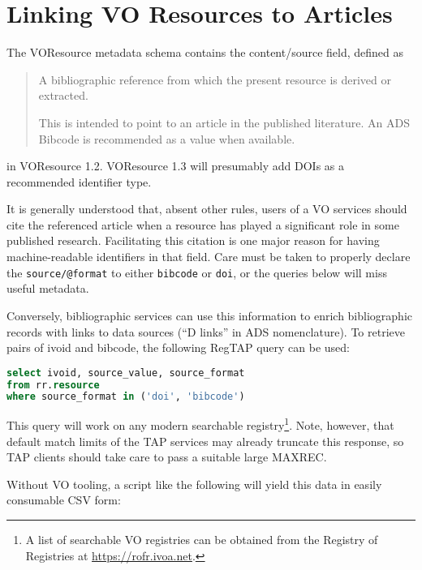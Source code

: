 \documentclass[11pt,a4paper]{ivoa}
\begin{document}
\section{Linking VO Resources to Articles}

The VOResource metadata schema \citep{2018ivoa.spec.0625P} contains the
content/source field, defined as

\begin{quotation}
\noindent A bibliographic reference from which the present resource is
derived or extracted.

\noindent This is intended to point to an article in the published
literature. An ADS Bibcode is recommended as a value when available.
\end{quotation}

\noindent in VOResource 1.2.  VOResource 1.3 will presumably add DOIs as a
recommended identifier type.

It is generally understood that, absent other rules, users of a VO
services should cite the referenced article when a resource has played a
significant role in some published research.  Facilitating this citation
is one major reason for having machine-readable identifiers in that
field.  Care must be taken to properly declare the \verb|source/@format|
to either \verb|bibcode| or \verb|doi|, or the queries below will miss
useful metadata.

Conversely, bibliographic services can use this information to enrich
bibliographic records with links to data sources (``D links'' in ADS
nomenclature).  To retrieve pairs of ivoid and bibcode, the following
RegTAP \citep{2019ivoa.spec.1011D} query can be used:

\begin{lstlisting}[language=SQL]
select ivoid, source_value, source_format
from rr.resource
where source_format in ('doi', 'bibcode')
\end{lstlisting}

This query will work on any modern searchable registry\footnote{A list
of searchable VO registries can be obtained from the Registry of
Registries at \url{https://rofr.ivoa.net}.}.  Note, however, that
default match limits of the TAP services may already truncate this
response, so TAP clients should take care to pass a suitable large
MAXREC.

Without VO tooling, a script like the following will yield this data in
easily consumable CSV form:


\end{document}
